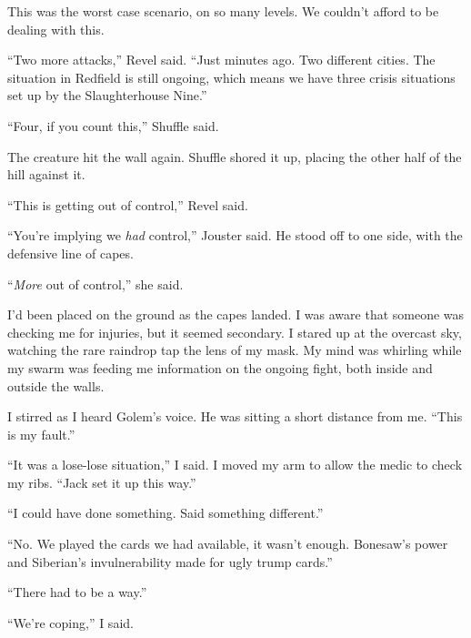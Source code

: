 This was the worst case scenario, on so many levels.  We couldn't afford to be dealing with this.



``Two more attacks,'' Revel said.  ``Just minutes ago.  Two different cities.  The situation in Redfield is still ongoing, which means we have three crisis situations set up by the Slaughterhouse Nine.''



``Four, if you count this,'' Shuffle said.



The creature hit the wall again.  Shuffle shored it up, placing the other half of the hill against it.



``This is getting out of control,'' Revel said.



``You're implying we \emph{had} control,'' Jouster said.  He stood off to one side, with the defensive line of capes.



``\emph{More} out of control,'' she said.



I'd been placed on the ground as the capes landed.  I was aware that someone was checking me for injuries, but it seemed secondary.  I stared up at the overcast sky, watching the rare raindrop tap the lens of my mask.  My mind was whirling while my swarm was feeding me information on the ongoing fight, both inside and outside the walls.



I stirred as I heard Golem's voice.  He was sitting a short distance from me.  ``This is my fault.''



``It was a lose-lose situation,'' I said.  I moved my arm to allow the medic to check my ribs.  ``Jack set it up this way.''



``I could have done something.  Said something different.''



``No.  We played the cards we had available, it wasn't enough.  Bonesaw's power and Siberian's invulnerability made for ugly trump cards.''



``There had to be a way.''



``We're coping,'' I said.



